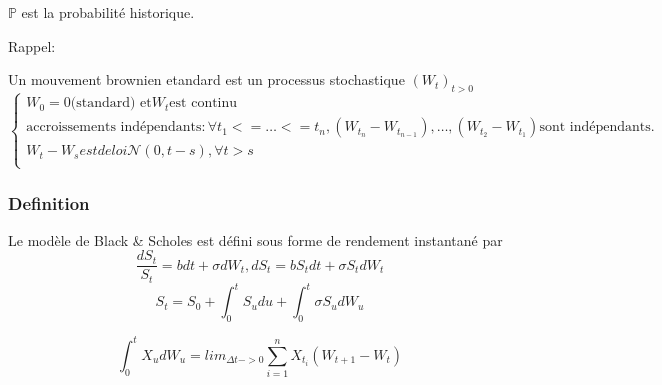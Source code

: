 \documentclass{article}
\begin{document}
$\mathbb{P}$ est la probabilit\'e historique.

Rappel:

Un mouvement brownien etandard est un processus stochastique $(W_t)_{t>0}$
\begin{equation}
\left\{\begin{array}{rcl}
W_0=0 \text{(standard) et} W_t \text{est continu}\\
\text{accroissements ind\'ependants}:\forall t_1<=\ldots <= t_n, (W_{t_n}-W_{t_{n-1}}),\ldots,(W_{t_2}-W_{t_1}) \text{sont ind\'ependants.}\\
W_t-W_s est de loi \mathcal{N}(0,t-s),\forall t>s\\
\end{array}\right.
\end{equation}

\subsubsection{Definition}
Le mod\`ele de Black \& Scholes est d\'efini sous forme de rendement instantan\'e par
\begin{equation}
\frac{d S_t}{S_t}=b dt+\sigma d W_t, d S_t=b S_t dt+\sigma S_t d W_t
\end{equation}
\begin{equation}
S_t=S_0+\int_0^t S_u du +\int_0^t \sigma S_u dW_u
\end{equation}

\begin{equation}
\int_0^t X_u dW_u=lim_{\Delta t->0}\sum_{i=1}^{n}X_{t_i}(W_{t+1}-W_t)
\end{equation}
\end{document}
